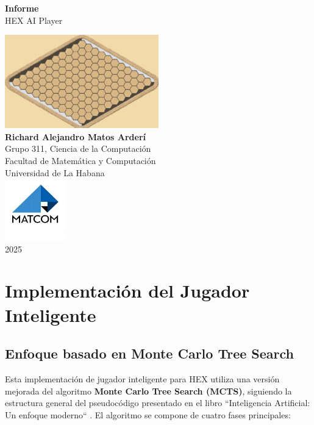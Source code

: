 \documentclass[a4paper, 12pt]{article}
\begin{document}
\graphicspath{{./}}

\begin{titlepage}
    \centering
    \vspace*{2cm}
    {\huge\bfseries Informe\\[0.4cm]}
    {\LARGE HEX AI Player\\}
    \vspace*{2cm}
    
     \includegraphics[width=0.5\textwidth, height=0.2\textheight]{Images/hextab.png}\\[0.5cm]
    {\Large \textbf{Richard Alejandro Matos Arderí}\\[0.5cm]}
    {\Large Grupo 311, Ciencia de la Computación\\[0.5cm]}
    {\Large Facultad de Matemática y Computación\\[0.5cm]}
    {\Large Universidad de La Habana\\[0.5cm]}
    \vfill
    \includegraphics[width=0.2\textwidth, height=0.2\textheight]{Images/MATCOM.jpg}\\[0.5cm]
    {\Large 2025}
\end{titlepage}

\newpage
\tableofcontents
\newpage


\section{Implementación del Jugador Inteligente}

\subsection{Enfoque basado en Monte Carlo Tree Search}
Esta implementación de jugador inteligente para HEX utiliza una versión mejorada del algoritmo \textbf{Monte Carlo Tree Search (MCTS)}, siguiendo la estructura general del pseudocódigo presentado en el libro ``Inteligencia Artificial: Un enfoque moderno`` . El algoritmo se compone de cuatro fases principales:
\end{document}

